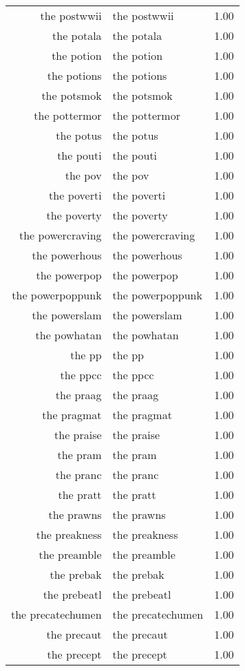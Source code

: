 \begin{table}[ht]
\begin{tabular}{rlr}
  the postwwii & the postwwii & 1.00 \\ 
  the potala & the potala & 1.00 \\ 
  the potion & the potion & 1.00 \\ 
  the potions & the potions & 1.00 \\ 
  the potsmok & the potsmok & 1.00 \\ 
  the pottermor & the pottermor & 1.00 \\ 
  the potus & the potus & 1.00 \\ 
  the pouti & the pouti & 1.00 \\ 
  the pov & the pov & 1.00 \\ 
  the poverti & the poverti & 1.00 \\ 
  the poverty & the poverty & 1.00 \\ 
  the powercraving & the powercraving & 1.00 \\ 
  the powerhous & the powerhous & 1.00 \\ 
  the powerpop & the powerpop & 1.00 \\ 
  the powerpoppunk & the powerpoppunk & 1.00 \\ 
  the powerslam & the powerslam & 1.00 \\ 
  the powhatan & the powhatan & 1.00 \\ 
  the pp & the pp & 1.00 \\ 
  the ppcc & the ppcc & 1.00 \\ 
  the praag & the praag & 1.00 \\ 
  the pragmat & the pragmat & 1.00 \\ 
  the praise & the praise & 1.00 \\ 
  the pram & the pram & 1.00 \\ 
  the pranc & the pranc & 1.00 \\ 
  the pratt & the pratt & 1.00 \\ 
  the prawns & the prawns & 1.00 \\ 
  the preakness & the preakness & 1.00 \\ 
  the preamble & the preamble & 1.00 \\ 
  the prebak & the prebak & 1.00 \\ 
  the prebeatl & the prebeatl & 1.00 \\ 
  the precatechumen & the precatechumen & 1.00 \\ 
  the precaut & the precaut & 1.00 \\ 
  the precept & the precept & 1.00 \\ 

\end{tabular}
\end{table}
